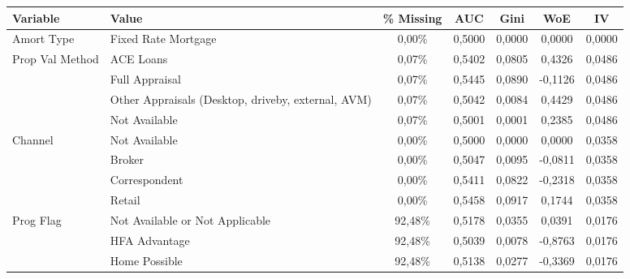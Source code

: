 {
\footnotesize

\begin{longtable}{ p{3cm} p{4cm} c c c c c}\toprule      
\textbf{Variable}           & \textbf{Value}                                     & \textbf{\% Missing} & \textbf{AUC}    & \textbf{Gini}  & \textbf{WoE} & \textbf{IV}  \\\midrule
Amort Type                  & Fixed Rate Mortgage                                               & 0,00\%  & 0,5000 & 0,0000 & 0,0000  & 0,0000 \\\hline
Prop Val Method             & ACE Loans                                                         & 0,07\%  & 0,5402 & 0,0805 & 0,4326  & 0,0486 \\
                            & Full Appraisal                                                    & 0,07\%  & 0,5445 & 0,0890 & -0,1126 & 0,0486 \\
                            & Other Appraisals (Desktop, driveby, external, AVM)                & 0,07\%  & 0,5042 & 0,0084 & 0,4429  & 0,0486 \\
                            & Not Available                                                     & 0,07\%  & 0,5001 & 0,0001 & 0,2385  & 0,0486 \\\hline
Channel                     & Not Available                                                     & 0,00\%  & 0,5000 & 0,0000 & 0,0000  & 0,0358 \\
                            & Broker                                                            & 0,00\%  & 0,5047 & 0,0095 & -0,0811 & 0,0358 \\
                            & Correspondent                                                     & 0,00\%  & 0,5411 & 0,0822 & -0,2318 & 0,0358 \\
                            & Retail                                                            & 0,00\%  & 0,5458 & 0,0917 & 0,1744  & 0,0358 \\\hline
Prog Flag                   & Not Available or Not Applicable                                   & 92,48\% & 0,5178 & 0,0355 & 0,0391  & 0,0176 \\
                            & HFA Advantage                                                     & 92,48\% & 0,5039 & 0,0078 & -0,8763 & 0,0176 \\
                            & Home Possible                                                     & 92,48\% & 0,5138 & 0,0277 & -0,3369 & 0,0176 \\\hline

\end{longtable}}
